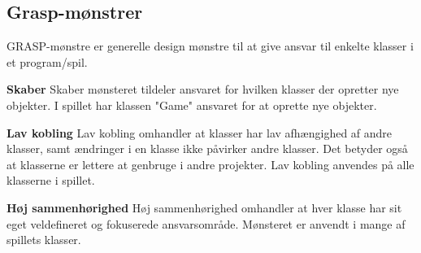 \subsection{Grasp-mønstrer}
GRASP-mønstre er generelle design mønstre til at give ansvar til enkelte klasser i et program/spil.

\vspace{.3cm}
\textbf{Skaber}
Skaber mønsteret tildeler ansvaret for hvilken klasser der opretter nye objekter.
I spillet har klassen "Game" ansvaret for at oprette nye objekter.

\vspace{.3cm}
\textbf{Lav kobling}
Lav kobling omhandler at klasser har lav afhængighed af andre klasser, samt ændringer i en klasse ikke påvirker andre klasser. Det betyder også at klasserne er lettere at genbruge i andre projekter. Lav kobling anvendes på alle klasserne i spillet. 

\vspace{.3cm}
\textbf{Høj sammenhørighed}
Høj sammenhørighed omhandler at hver klasse har sit eget veldefineret og fokuserede ansvarsområde. Mønsteret er anvendt i mange af spillets klasser.




